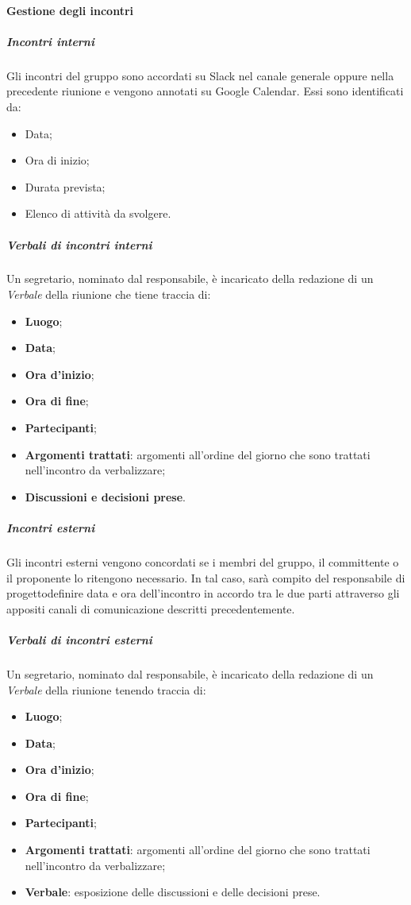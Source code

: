 			\paragraph{Gestione degli incontri}
				\subparagraph*{Incontri interni}
					Gli incontri del gruppo sono accordati su Slack nel canale generale oppure nella precedente riunione e vengono annotati su Google Calendar. Essi sono identificati da:
					\begin{itemize}
						\item Data;
						\item Ora di inizio;
						\item Durata prevista;
						\item Elenco di attività da svolgere.
					\end{itemize}
				\subparagraph*{Verbali di incontri interni}
					Un segretario, nominato dal responsabile, è incaricato della redazione di un \textit{Verbale} della riunione che tiene traccia di:
					\begin{itemize}
						\item \textbf{Luogo};
						\item \textbf{Data};
						\item \textbf{Ora d'inizio};
						\item \textbf{Ora di fine};
						\item \textbf{Partecipanti};
						\item \textbf{Argomenti trattati}: argomenti all'ordine del giorno che sono trattati nell'incontro da verbalizzare;
						\item \textbf{Discussioni e decisioni prese}.
					\end{itemize}
				\subparagraph*{Incontri esterni}
					Gli incontri esterni vengono concordati se i membri del gruppo, il committente o il proponente lo ritengono necessario. In tal caso, sarà compito del responsabile di progetto\glosp definire data e ora dell'incontro in accordo tra le due parti attraverso gli appositi canali di comunicazione descritti precedentemente.
				\subparagraph*{Verbali di incontri esterni}
					Un segretario, nominato dal responsabile, è incaricato della redazione di un \textit{Verbale} della riunione tenendo traccia di:
					\begin{itemize}
						\item \textbf{Luogo};
						\item \textbf{Data};
						\item \textbf{Ora d'inizio};
						\item \textbf{Ora di fine};
						\item \textbf{Partecipanti};
						\item \textbf{Argomenti trattati}: argomenti all'ordine del giorno che sono trattati nell'incontro da verbalizzare;
						\item \textbf{Verbale}: esposizione delle discussioni e delle decisioni prese.
					\end{itemize}
